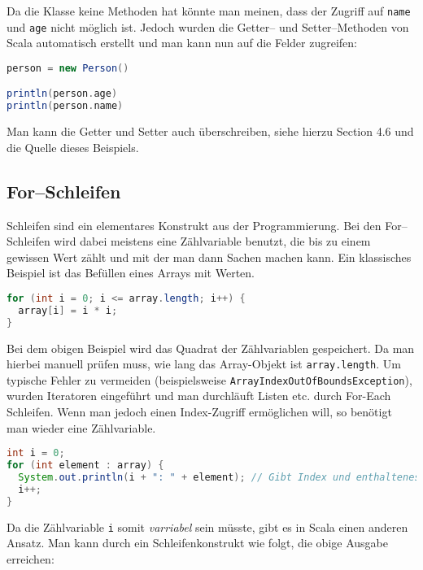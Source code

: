 Da die Klasse keine Methoden hat könnte man meinen, dass der Zugriff auf \texttt{name} und \texttt{age} nicht möglich ist. Jedoch wurden die Getter-- und Setter--Methoden von Scala automatisch erstellt und man kann nun auf die Felder zugreifen:

\begin{lstlisting}[language=Scala]
person = new Person()

println(person.age)
println(person.name)
\end{lstlisting}

Man kann die Getter und Setter auch überschreiben, siehe hierzu \cite{ScalaCookbook} Section 4.6 und die Quelle dieses Beispiels.

\subsection{For--Schleifen}\label{sec:for-loops}

Schleifen sind ein elementares Konstrukt aus der Programmierung. Bei den For--Schleifen wird dabei meistens eine Zählvariable benutzt, die bis zu einem gewissen Wert zählt und mit der man dann Sachen machen kann. Ein klassisches Beispiel ist das Befüllen eines Arrays mit Werten.

\begin{lstlisting}[language=Java,caption=Typische For--Schleife aus der Java Programmierung]
for (int i = 0; i <= array.length; i++) {
  array[i] = i * i;
}
\end{lstlisting}

Bei dem obigen Beispiel wird das Quadrat der Zählvariablen gespeichert. Da man hierbei manuell prüfen muss, wie lang das Array-Objekt ist \texttt{array.length}. Um typische Fehler zu vermeiden (beispielsweise \texttt{ArrayIndexOutOfBoundsException}), wurden Iteratoren eingeführt und man durchläuft Listen etc. durch For-Each Schleifen. Wenn man jedoch einen Index-Zugriff ermöglichen will, so benötigt man wieder eine Zählvariable.

\begin{lstlisting}[language=Java]
int i = 0;
for (int element : array) {
  System.out.println(i + ": " + element); // Gibt Index und enthaltenes Element aus
  i++;
}
\end{lstlisting}

Da die Zählvariable \texttt{i} somit \textit{varriabel} sein müsste, gibt es in Scala einen anderen Ansatz. Man kann durch ein Schleifenkonstrukt wie folgt, die obige Ausgabe erreichen:


